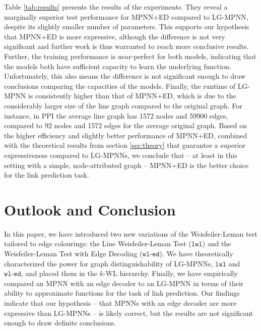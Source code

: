 \documentclass{article}
\newcommand{\wledge}{\texttt{wl-ed}}
\newcommand{\lwl}{\texttt{lwl}}
\begin{document}
Table \ref{tab:results} presents the results of the experiments. They reveal a marginally superior test performance for MPNN+ED compared to LG-MPNN, despite its slightly smaller number of parameters. This supports our hypothesis that MPNN+ED is more expressive, although the difference is not very significant and further work is thus warranted to reach more conclusive results.
Further, the training performance is near-perfect for both models, indicating that the models both have sufficient capacity to learn the underlying function. Unfortunately, this also means the difference is not significant enough to draw conclusions comparing the capacities of the models.
Finally, the runtime of LG-MPNN is consistently higher than that of MPNN+ED, which is due to the considerably larger size of the line graph compared to the original graph. For instance, in PPI the average line graph has 1572 nodes and 59900 edges, compared to 92 nodes and 1572 edges for the average original graph.
Based on the higher efficiency and slightly better performance of MPNN+ED, combined with the theoretical results from section \ref{sec:theory} that guarantee a superior expressiveness compared to LG-MPNNs, we conclude that -- at least in this setting with a simple, node-attributed graph -- MPNN+ED is the better choice for the link prediction task.


\section{Outlook and Conclusion}



In this paper, we have introduced two new variations of the Weisfeiler-Leman test tailored to edge colourings: the Line Weisfeiler-Leman Test ($\lwl$) and the Weisfeiler-Leman Test with Edge Decoding ($\wledge$).
We have theoretically characterized the power for graph distinguishability of LG-MPNNs, $\lwl$ and $\wledge$, and placed them in the $k$-WL hierarchy.
%
Finally, we have empirically compared an MPNN with an edge decoder to an LG-MPNN in terms of their ability to approximate functions for the task of link prediction. Our findings indicate that our hypothesis -- that MPNNs with an edge decoder are more expressive than LG-MPNNs -- is likely correct, but the results are not significant enough to draw definite conclusions.
\end{document}
